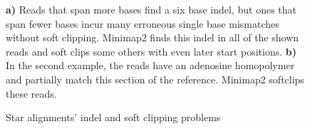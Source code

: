 \begin{figure}[htbp!]


\begin{centering}
\caption{Star alignments' indel and soft clipping problems}\label{fig:softclipping}



\textbf{a)} Reads that span more bases find a six base indel, but ones that span fewer bases incur many erroneous single base mismatches without soft clipping. Minimap2 finds this indel in all of the shown reads and soft clips some others with even later start positions. \textbf{b)} In the second example, the reads have an adenosine homopolymer and partially match this section of the reference. Minimap2 softclips these reads. 
\end{centering}
\end{figure}
